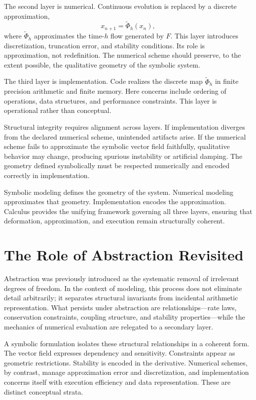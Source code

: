 \documentclass[12pt]{book}
\begin{document}
The second layer is numerical. Continuous evolution is replaced by a
discrete approximation,
\[
x_{n+1} = \tilde{\Phi}_h(x_n),
\]
where $\tilde{\Phi}_h$ approximates the time-$h$ flow generated by $F$.
This layer introduces discretization, truncation error, and stability
conditions. Its role is approximation, not redefinition. The numerical
scheme should preserve, to the extent possible, the qualitative
geometry of the symbolic system.

The third layer is implementation. Code realizes the discrete map
$\tilde{\Phi}_h$ in finite precision arithmetic and finite memory.
Here concerns include ordering of operations, data structures, and
performance constraints. This layer is operational rather than
conceptual.

Structural integrity requires alignment across layers. If
implementation diverges from the declared numerical scheme, unintended
artifacts arise. If the numerical scheme fails to approximate the
symbolic vector field faithfully, qualitative behavior may change,
producing spurious instability or artificial damping. The geometry
defined symbolically must be respected numerically and encoded
correctly in implementation.

Symbolic modeling defines the geometry of the system. Numerical
modeling approximates that geometry. Implementation encodes the
approximation. Calculus provides the unifying framework governing
all three layers, ensuring that deformation, approximation, and
execution remain structurally coherent.

\section{The Role of Abstraction Revisited}

Abstraction was previously introduced as the systematic removal of
irrelevant degrees of freedom. In the context of modeling, this process
does not eliminate detail arbitrarily; it separates structural
invariants from incidental arithmetic representation. What persists
under abstraction are relationships---rate laws, conservation
constraints, coupling structure, and stability properties---while the
mechanics of numerical evaluation are relegated to a secondary layer.

A symbolic formulation isolates these structural relationships in a
coherent form. The vector field expresses dependency and sensitivity.
Constraints appear as geometric restrictions. Stability is encoded in
the derivative. Numerical schemes, by contrast, manage approximation
error and discretization, and implementation concerns itself with
execution efficiency and data representation. These are distinct
conceptual strata.
\end{document}
